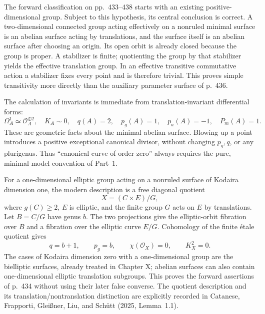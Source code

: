 The forward classification on pp.~433--438 starts with an existing positive-dimensional group. Subject to this hypothesis, its central conclusion is correct. A two-dimensional connected group acting effectively on a nonruled minimal surface is an abelian surface acting by translations, and the surface itself is an abelian surface after choosing an origin. Its open orbit is already closed because the group is proper. A stabilizer is finite; quotienting the group by that stabilizer yields the effective translation group. In an effective transitive commutative action a stabilizer fixes every point and is therefore trivial. This proves simple transitivity more directly than the auxiliary parameter surface of p.~436.

The calculation of invariants is immediate from translation-invariant differential forms:
\[
\Omega_A^1\simeq\mathcal O_A^{\oplus2},\quad
K_A\sim0,\quad q(A)=2,\quad p_g(A)=1,
\quad p_a(A)=-1,\quad P_m(A)=1.
\]
These are geometric facts about the minimal abelian surface. Blowing up a point introduces a positive exceptional canonical divisor, without changing \(p_g,q\), or any plurigenus. Thus ``canonical curve of order zero'' always requires the pure, minimal-model convention of Part~1.

For a one-dimensional elliptic group acting on a nonruled surface of Kodaira dimension one, the modern description is a free diagonal quotient
\[
X=(C\times E)/G,
\]
where \(g(C)\ge2\), \(E\) is elliptic, and the finite group \(G\) acts on \(E\) by translations. Let \(B=C/G\) have genus \(b\). The two projections give the elliptic-orbit fibration over \(B\) and a fibration over the elliptic curve \(E/G\). Cohomology of the finite \'etale quotient gives
\[
q=b+1,\qquad p_g=b,\qquad\chi(\mathcal O_X)=0,
\qquad K_X^2=0.
\]
The cases of Kodaira dimension zero with a one-dimensional group are the bielliptic surfaces, already treated in Chapter X; abelian surfaces can also contain one-dimensional elliptic translation subgroups. This proves the forward assertions of p.~434 without using their later false converse. The quotient description and its translation/nontranslation distinction are explicitly recorded in Catanese, Frapporti, Glei\ss ner, Liu, and Sch\"utt (2025, Lemma~1.1).

